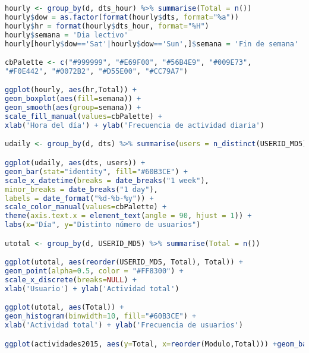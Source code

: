 \begin{lstlisting}[language=r]
hourly <- group_by(d, dts_hour) %>% summarise(Total = n())
hourly$dow = as.factor(format(hourly$dts, format="%a"))
hourly$hr = format(hourly$dts_hour, format="%H")
hourly$semana = 'Dia lectivo'
hourly[hourly$dow=='Sat'|hourly$dow=='Sun',]$semana = 'Fin de semana'

cbPalette <- c("#999999", "#E69F00", "#56B4E9", "#009E73",
"#F0E442", "#0072B2", "#D55E00", "#CC79A7")

ggplot(hourly, aes(hr,Total)) +
geom_boxplot(aes(fill=semana)) +
geom_smooth(aes(group=semana)) +
scale_fill_manual(values=cbPalette) +
xlab('Hora del día') + ylab('Frecuencia de actividad diaria')

udaily <- group_by(d, dts) %>% summarise(users = n_distinct(USERID_MD5))

ggplot(udaily, aes(dts, users)) +
geom_bar(stat="identity", fill="#60B3CE") +
scale_x_datetime(breaks = date_breaks("1 week"),
minor_breaks = date_breaks("1 day"),
labels = date_format("%d-%b-%y")) +
scale_color_manual(values=cbPalette) +
theme(axis.text.x = element_text(angle = 90, hjust = 1)) +
labs(x="Día", y="Distinto número de usuarios")

utotal <- group_by(d, USERID_MD5) %>% summarise(Total = n())

ggplot(utotal, aes(reorder(USERID_MD5, Total), Total)) +
geom_point(alpha=0.5, color = "#FF8300") +
scale_x_discrete(breaks=NULL) +
xlab('Usuario') + ylab('Actividad total')

ggplot(utotal, aes(Total)) +
geom_histogram(binwidth=10, fill="#60B3CE") +
xlab('Actividad total') + ylab('Frecuencia de usuarios')

ggplot(actividades2015, aes(y=Total, x=reorder(Modulo,Total))) +geom_bar(stat="identity", width=0.2)  +theme_minimal() + coord_flip() + labs(x="", y="")

\end{lstlisting}

